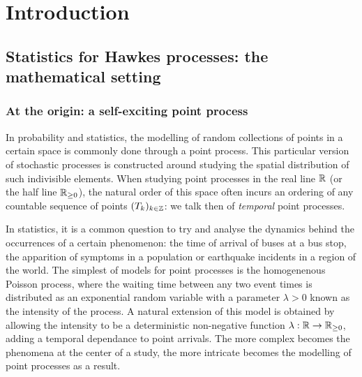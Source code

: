 
\chapter{Introduction}

\section{Statistics for Hawkes processes: the mathematical setting}
    \subsection{At the origin: a self-exciting point process}
    In probability and statistics, the modelling of random collections of points in a certain space is commonly done through a point process.
    This particular version of stochastic processes is constructed around studying the spatial distribution of such indivisible elements.
    When studying point processes in the real line ${\mathbb R}$ (or the half line ${\mathbb R}_{\geq 0}$), the natural order of this space often incurs an ordering of any countable sequence of points $(T_k)_{k\in{\mathbb Z}}$: we talk then of \emph{temporal} point processes.

    In statistics, it is a common question to try and analyse the dynamics behind the occurrences of a certain phenomenon: the time of arrival of buses at a bus stop, the apparition of symptoms in a population or earthquake incidents in a region of the world.
    The simplest of models for point processes is the homogenenous Poisson process, where the waiting time between any two event times is distributed as an exponential random variable with a parameter $\lambda > 0$ known as the intensity of the process.
    A natural extension of this model is obtained by allowing the intensity to be a deterministic non-negative function $\lambda:{\mathbb R} \to {\mathbb R}_{\geq0}$, adding a temporal dependance to point arrivals.
    The more complex becomes the phenomena at the center of a study, the more intricate becomes the modelling of point processes as a result. 

